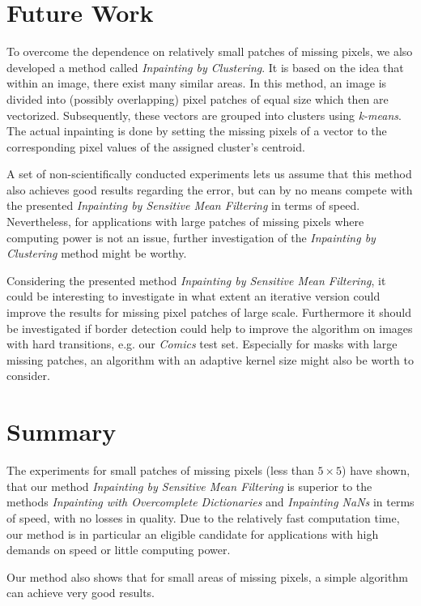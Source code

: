 \documentclass[10pt,conference,compsocconf]{IEEEtran}
\begin{document}
\section{Future Work}
\label{sec:future}
To overcome the dependence on relatively small patches of missing pixels, we also developed a method called \emph{Inpainting by Clustering}. It is based on the idea that within an image, there exist many similar areas. In this method, an image is divided into (possibly overlapping) pixel patches of equal size which then are vectorized. Subsequently, these vectors are grouped into clusters using \emph{k-means}. The actual inpainting is done by setting the missing pixels of a vector to the corresponding pixel values of the assigned cluster's centroid.

A set of non-scientifically conducted experiments lets us assume that this method also achieves good results regarding the error, but can by no means compete with the presented \emph{Inpainting by Sensitive Mean Filtering} in terms of speed. Nevertheless, for applications with large patches of missing pixels where computing power is not an issue, further investigation of the \emph{Inpainting by Clustering} method might be worthy.

Considering the presented method \emph{Inpainting by Sensitive Mean Filtering}, it could be interesting to investigate in what extent an iterative version could improve the results for missing pixel patches of large scale. Furthermore it should be investigated if border detection could help to improve the algorithm on images with hard transitions, e.g. our  \emph{Comics} test set. Especially for masks with large missing patches, an algorithm with an adaptive kernel size might also be worth to consider.


\section{Summary}
\label{sec:summary}
The experiments for small patches of missing pixels (less than $5 \times 5$) have shown, that our method \emph{Inpainting by Sensitive Mean Filtering} is superior to the methods \emph{Inpainting with Overcomplete Dictionaries} and \emph{Inpainting NaNs} in terms of speed, with no losses in quality.
Due to the relatively fast computation time, our method is in particular an eligible candidate for applications with high demands on speed or little computing power.

Our method also shows that for small areas of missing pixels, a simple algorithm can achieve very good results.



\end{document}
